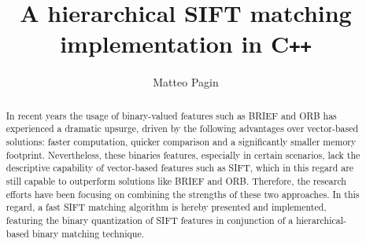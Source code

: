 \documentclass[a4paper, 12pt, oneside]{article}
\date{}
\begin{document}
\title{\vspace{-2.0cm}\huge A hierarchical SIFT matching \\ implementation in C\texttt{++}} 
\author[1]{\Large Matteo Pagin}

\maketitle

\thispagestyle{empty}

\begin{abstract}
	In recent years the usage of binary-valued features such as BRIEF and ORB has experienced a dramatic upsurge, driven by the following advantages over vector-based solutions: faster computation, quicker comparison and a significantly smaller memory footprint. Nevertheless, these binaries features, especially in certain scenarios, lack the descriptive capability of vector-based features such as SIFT, which in this regard are still capable to outperform solutions like BRIEF and ORB. Therefore, the research efforts have been focusing on combining the strengths of these two approaches. In this regard, a fast SIFT matching algorithm is hereby presented and implemented, featuring the binary quantization of SIFT features in conjunction of a hierarchical-based binary matching technique.
\end{abstract}
\end{document}
